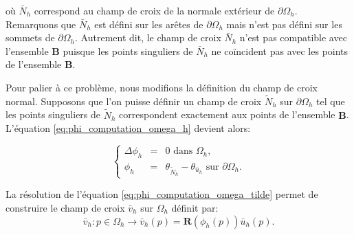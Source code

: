 où $\bar{N}_h$ correspond au champ de croix de la normale extérieur de $\partial\Omega_h$. Remarquons que $\bar{N}_h$ est défini sur les arêtes de $\partial\Omega_h$ mais n'est pas défini sur les sommets de $\partial\Omega_h$. Autrement dit, le champ de croix $\bar{N}_h$ n'est pas compatible avec l'ensemble $\mathbf{B}$ puisque les points singuliers de $\bar{N}_h$ ne coïncident pas avec les points de l'ensemble $\mathbf{B}$. 


Pour palier à ce problème, nous modifions la définition du champ de croix normal. Supposons que l'on puisse définir un champ de croix $\widetilde{N}_h$ sur $\partial\Omega_h$ tel que les points singuliers de $\widetilde{N}_h$ correspondent exactement aux points de l'ensemble $\mathbf{B}$. L'équation \eqref{eq:phi_computation_omega_h} devient alors:

\begin{equation}
\left\{
\begin{array}{lcl}
\Delta\phi_h &=& 0 \mbox{ dans }\Omega_h,\\[0.25cm]
\phi_h &=& \theta_{\widetilde{N}_h}-\theta_{\bar{u}_h} \mbox{ sur } \partial\Omega_h.
\end{array}
\right.
\label{eq:phi_computation_omega_tilde}
\end{equation}

La résolution de l'équation \eqref{eq:phi_computation_omega_tilde} permet de construire le champ de croix $\bar{v}_h$ sur $\Omega_h$ définit par:
$$\bar{v}_h:p\in\Omega_h\longrightarrow \bar{v}_h(p)=\mathbf{R}(\phi_h(p))\bar{u}_h(p).$$

\newpage

